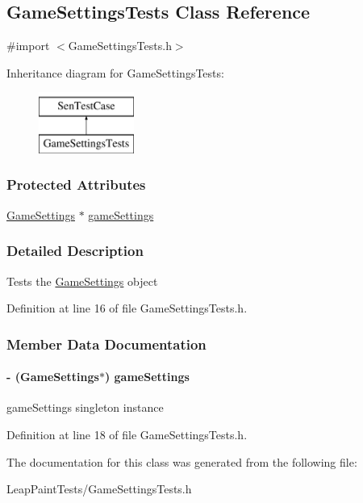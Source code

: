 \hypertarget{interface_game_settings_tests}{\subsection{Game\-Settings\-Tests Class Reference}
\label{d9/ddc/interface_game_settings_tests}
}


{\ttfamily \#import $<$Game\-Settings\-Tests.\-h$>$}

Inheritance diagram for Game\-Settings\-Tests\-:\begin{figure}[H]
\begin{center}
\leavevmode
\includegraphics[height=2.000000cm]{d9/ddc/interface_game_settings_tests}
\end{center}
\end{figure}
\subsubsection*{Protected Attributes}
\begin{DoxyCompactItemize}
\item 
\hyperlink{interface_game_settings}{Game\-Settings} $\ast$ \hyperlink{interface_game_settings_tests_abe72ed6a60e61029a7f71293ffef436e}{game\-Settings}
\end{DoxyCompactItemize}


\subsubsection{Detailed Description}
Tests the \hyperlink{interface_game_settings}{Game\-Settings} object 

Definition at line 16 of file Game\-Settings\-Tests.\-h.



\subsubsection{Member Data Documentation}
\hypertarget{interface_game_settings_tests_abe72ed6a60e61029a7f71293ffef436e}{
\paragraph[{game\-Settings}]{\setlength{\rightskip}{0pt plus 5cm}-\/ ({\bf Game\-Settings}$\ast$) game\-Settings\hspace{0.3cm}{\ttfamily [protected]}}}\label{d9/ddc/interface_game_settings_tests_abe72ed6a60e61029a7f71293ffef436e}
game\-Settings singleton instance 

Definition at line 18 of file Game\-Settings\-Tests.\-h.



The documentation for this class was generated from the following file\-:\begin{DoxyCompactItemize}
\item 
Leap\-Paint\-Tests/Game\-Settings\-Tests.\-h\end{DoxyCompactItemize}
